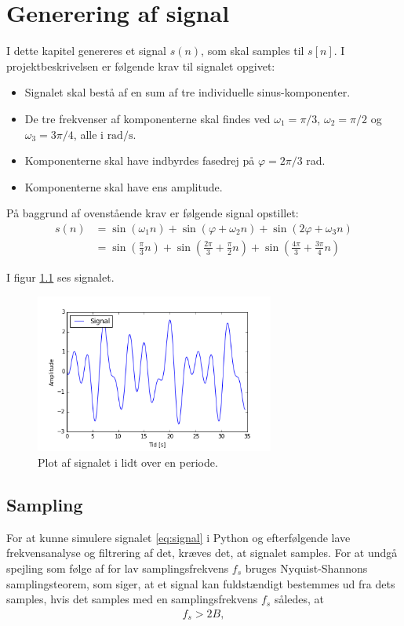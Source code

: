 \chapter{Generering af signal}
I dette kapitel genereres et signal $s(n)$, som skal samples til $s[n]$. I projektbeskrivelsen er følgende krav til signalet opgivet:
\begin{itemize}
\setlength\itemsep{0em}
\item Signalet skal bestå af en sum af tre individuelle sinus-komponenter.
\item De tre frekvenser af komponenterne skal findes ved $\omega_1=\pi/3$, $\omega_2=\pi/2$ og $\omega_3=3\pi/4$, alle i $\text{rad}/\text{s}$.
\item Komponenterne skal have indbyrdes fasedrej på $\varphi=2\pi/3$ rad.
\item Komponenterne skal have ens amplitude.
\end{itemize}

På baggrund af ovenstående krav er følgende signal opstillet:
\begin{align} \label{eq:signal}
s(n)&=\sin\left(\omega_1n\right)+\sin\left(\varphi+\omega_2n\right)+\sin\left(2\varphi+\omega_3n\right)\\
&=\sin\left(\frac{\pi}{3}n\right)+\sin\left(\frac{2\pi}{3}+\frac{\pi}{2}n\right)+\sin\left(\frac{4\pi}{3}+\frac{3\pi}{4}n\right)
\end{align}

I figur \ref{fig:signal} ses signalet.
\begin{figure}[H]
\centering
\includegraphics[width=0.7\textwidth]{figures/signal.png}
\caption{Plot af signalet i lidt over en periode.}
\label{fig:signal}
\end{figure}
\section{Sampling}
For at kunne simulere signalet \eqref{eq:signal} i Python og efterfølgende lave frekvensanalyse og filtrering af det, kræves det, at signalet samples. For at undgå spejling som følge af for lav samplingsfrekvens $f_s$ bruges Nyquist-Shannons samplingsteorem, som siger, at et signal kan fuldstændigt bestemmes ud fra dets samples, hvis det samples med en samplingsfrekvens $f_s$ således, at
\begin{align}
f_s > 2B,
\end{align}

